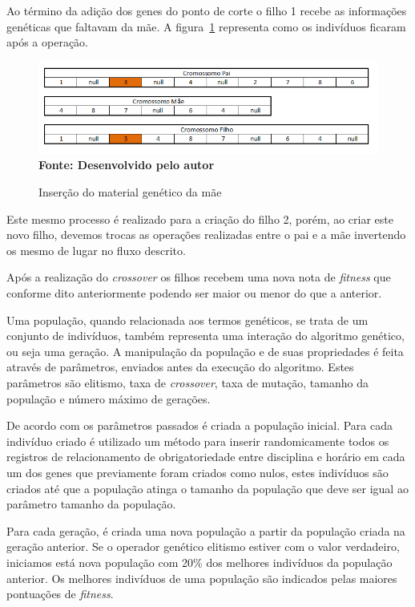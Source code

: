 Ao término da adição dos genes do ponto de corte o filho 1 recebe as informações genéticas que faltavam da mãe. A figura~\ref{fig:materialMae} representa como os indivíduos ficaram após a operação.

\begin{figure}[!htb]
\caption[Inserção do material genético da mãe]{Inserção do material genético da mãe}
\label{fig:materialMae}
\centering
\includegraphics[scale=0.7]{imagens/insersaoMaterialMae.png}
\\ \textbf{\footnotesize Fonte: Desenvolvido pelo autor}
\end{figure}

Este mesmo processo é realizado para a criação do filho 2, porém, ao criar este novo filho, devemos trocas as operações realizadas entre o pai e a mãe invertendo os mesmo de lugar no fluxo descrito.

Após a realização do \textit{crossover} os filhos recebem uma nova nota de \textit{fitness} que conforme dito anteriormente podendo ser maior ou menor do que a anterior.

Uma população, quando relacionada aos termos genéticos, se trata de um conjunto de indivíduos, também representa uma interação do algoritmo genético, ou seja uma geração. A manipulação da população e de suas propriedades é feita através de parâmetros, enviados antes da execução do algoritmo. Estes parâmetros são elitismo, taxa de \textit{crossover}, taxa de mutação, tamanho da população e número máximo de gerações.

De acordo com os parâmetros passados é criada a população inicial. Para cada indivíduo criado é utilizado um método para inserir randomicamente todos os registros de relacionamento de obrigatoriedade entre disciplina e horário em cada um dos genes que previamente foram criados como nulos, estes indivíduos são criados até que a população atinga o tamanho da população que deve ser igual ao parâmetro tamanho da população.\par

Para cada geração, é criada uma nova população a partir da população criada na geração anterior. Se o operador genético elitismo estiver com o valor verdadeiro, iniciamos está nova população com 20\% dos melhores indivíduos da população anterior. Os melhores indivíduos de uma população são indicados pelas maiores pontuações de \textit{fitness}.\par

